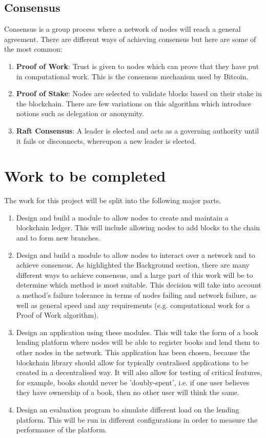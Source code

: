 \documentclass[12pt, letterpaper, twoside]{article}
\begin{document}
	\subsection*{Consensus}
	\noindent Consensus is a group process where a network of nodes will reach a general agreement. There are different ways of achieving consensus but here are some of the most common:
	\begin{enumerate}

	\item \textbf{Proof of Work}: Trust is given to nodes which can prove that they have put in computational work. This is the consensus mechanism used by Bitcoin.
	\item \textbf{Proof of Stake}: Nodes are selected to validate blocks based on their stake in the blockchain. There are few variations on this algorithm which introduce notions such as delegation or anonymity.
	\item \textbf{Raft Consensus}: A leader is elected and acts as a governing authority until it fails or disconnects, whereupon a new leader is elected.
	\end{enumerate}

	\section*{Work to be completed}
	The work for this project will be split into the following major parts.
	\begin{enumerate} 
		\item Design and build a module to allow nodes to create and maintain a blockchain ledger. This will include allowing nodes to add blocks to the chain and to form new branches.
		\item Design and build a module to allow nodes to interact over a network and to achieve consensus. As highlighted the Background section, there are many different ways to achieve consensus, and a large part of this work will be to determine which method is most suitable. This decision will take into account a method's failure tolerance in terms of nodes failing and network failure, as well as general speed and any requirements (e.g. computational work for a Proof of Work algorithm).
		\item Design an application using these modules. This will take the form of a book lending platform where nodes will be able to register books and lend them to other nodes in the network. This application has been chosen, because the blockchain library should allow for typically centralised applications to be created in a decentralised way. It will also allow for testing of critical features, for example, books should never be 'doubly-spent', i.e. if one user believes they have ownership of a book, then no other user will think the same.
		\item Design an evaluation program to simulate different load on the lending platform. This will be run in different configurations in order to measure the performance of the platform.
	\end{enumerate}
\end{document}
